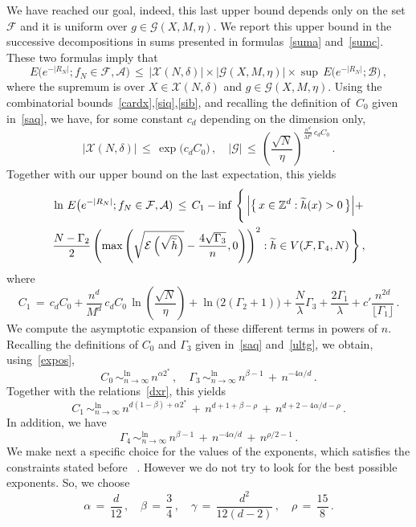 \documentclass[AHL, Unicode, longabstracts, published]{cedram}
\newcommand*\lsim{\mathop{\sim}^{\ln}_{n\to\infty}}
\newcommand*\Zd {{\mathbb Z^d}}
\newcommand*\wh{{\tilde h}}
\newcommand{\cA}{\mathcal{A}}
\newcommand{\cB}{\mathcal{B}}
\newcommand{\cE}{\mathcal{E}}
\newcommand{\cF}{\mathcal{F}}
\newcommand{\cG}{\mathcal{G}}
\newcommand{\cX}{\mathcal{X}}
\let\oldtilde\tilde
\renewcommand*{\tilde}[1]{\mathchoice{\widetilde{#1}}{\widetilde{#1}}{\oldtilde{#1}}{\oldtilde{#1}}}\let\oldhat\hat
\renewcommand*{\hat}[1]{\mathchoice{\widehat{#1}}{\widehat{#1}}{\oldhat{#1}}{\oldhat{#1}}}\let\oldexists\exists
\renewcommand*{\exists}{\mathrel{\oldexists}}
\begin{document}
We have reached our goal, indeed, this last upper bound depends only on the set~$\cF$ and it is uniform over $g\in
\cG(X,M,\eta)$. We report this upper bound in the successive decompositions in sums presented in formulas~\eqref{suma} and~\eqref{sumc}. These two formulas imply that
\[
E\big(e^{-|R_N|}; f_N\in\cF,\cA)\,\leq\,
\big|{\cX(N,\delta)}\big|\times
\big|{\cG(X,M,\eta)}\big|\times
\sup\, E\big(e^{-|R_N|};
\cB
\big)
\,,
\]
where the supremum is over $X\in{\cX(N,\delta)}$ and $g \in{\cG(X,M,\eta)}$. Using the combinatorial bounds~\eqref{cardx},\eqref{siq},\eqref{sib}, and recalling the definition of~$C_0$ given in~\eqref{saq}, we have, for some constant $c_d$ depending on the dimension only,
\[
\big|
\cX(N,\delta)
\big|\,\leq\,
\exp\big(c_dC_0\big)\,,\quad |\cG|
\,\leq\,
\left(\frac{\sqrt{N}}{\eta}\right)^{\displaystyle
\frac{n^d}{M^d}\,c_dC_0}\,.
\]
Together with our upper bound on the last expectation, this yields
\begin{multline}\label{gou}
\ln\,E\big(e^{-|R_N|}; f_N\in\cF,\cA)\,\leq\, C_1-
\inf\,\Bigg\{\,
\Big|\big\{\,x\in\Zd:\wh(x)>0\,\big\}\Big| +
\\
\frac{N-\Gamma_2}{2}
\left(\max\left(
\sqrt{\cE\left(\sqrt{\widetilde h}\right)}-
\frac{4\sqrt{\Gamma_3}}{n},0\right) \right)^2 : \wh\in V(\cF,\Gamma_4,N)
\,\Bigg\}
\,,
\end{multline}
where
\[
C_1\,=\,
c_dC_0+
\frac{n^d}{M^d}\,c_dC_0\,\ln
\left(\frac{\sqrt{N}}{\eta}\right)+
\ln\big(2(\Gamma_2+1)\big)+
\frac{N}{\lambda}\Gamma_3 +\frac{2\Gamma_1}{\lambda} + c'\frac{n^{2d}}{\lfloor\Gamma_1\rfloor}
\,.
\]
We compute the asymptotic expansion of these different terms in powers of $n$. Recalling the definitions of $C_0$ and $\Gamma_3$ given in~\eqref{saq} and~\eqref{ultg}, we obtain, using~\eqref{expos},
\begin{equation}\label{fxr}
C_0\,\lsim\,n^{\alpha 2^*}\,,\quad
\Gamma_3\,\lsim\, n^{\beta-1}\,+
\,n^{-4\alpha/d}\,.
\end{equation}
Together with the relations~\eqref{dxr}, this yields
\begin{equation}\label{vxr}
C_1\,\lsim\,n^{d(1-\beta)+\alpha 2^*}
\,+\,n^{d+1+\beta-\rho }
\,+\,n^{d+2-4\alpha/d-\rho }
\,.
\end{equation}
In addition, we have
\[
\Gamma_4\,\lsim\,
n^{\beta-1}\,+
\,n^{-4\alpha/d}\,+
\,n^{\rho/2-1}\,.
\]
We make next a specific choice for the values of the exponents, which satisfies the constraints stated before~\label{expo}
. However we do not try to look for the best possible exponents. So, we choose
\begin{equation}\label{choi}
\alpha\,=\,\frac{d}{12}\,,\quad
\beta\,=\,\frac{3}{4}\,,\quad
\gamma\,=\,\frac{d^2}{12(d-2)}\,,\quad
\rho\,=\,\frac{15}{8}\,.
\end{equation}
\end{document}
